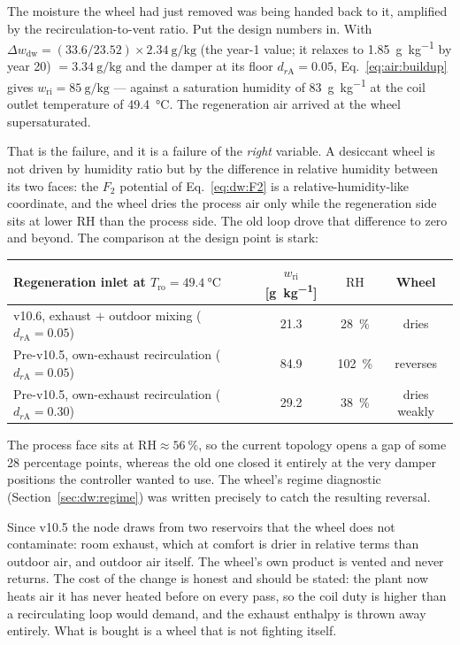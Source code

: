 \documentclass[11pt]{article}
\providecommand{\celsius}{\degreeCelsius}
\newcommand{\RH}{\ensuremath{\mathrm{RH}}}
\begin{document}
The moisture the wheel had just removed was being handed back to it, amplified
by the recirculation-to-vent ratio. Put the design numbers in. With
$\Delta w_{\mathrm{dw}} = (33.6/23.52)\times\SI{2.34}{\gram\per\kilogram}$ (the
year-1 value; it relaxes to \SI{1.85}{\gram\per\kilogram} by year 20)
$
= \SI{3.34}{\gram\per\kilogram}$ and the damper at its floor
$d_{r\mathrm{A}}=0.05$, Eq.~\eqref{eq:air:buildup} gives
$w_{\mathrm{ri}}=\SI{85}{\gram\per\kilogram}$ --- against a saturation humidity
of \SI{83}{\gram\per\kilogram} at the coil outlet temperature of
\SI{49.4}{\celsius}. The regeneration air arrived at the wheel supersaturated.

That is the failure, and it is a failure of the \emph{right} variable. A
desiccant wheel is not driven by humidity ratio but by the difference in
relative humidity between its two faces: the $F_2$ potential of
Eq.~\eqref{eq:dw:F2} is a relative-humidity-like coordinate, and the wheel
dries the process air only while the regeneration side sits at lower $\RH$
than the process side. The old loop drove that difference to zero and beyond.
The comparison at the design point is stark:

\begin{center}
\begin{tabular}{@{}lccc@{}}
\toprule
Regeneration inlet at $T_{\mathrm{ro}}=\SI{49.4}{\celsius}$
 & $w_{\mathrm{ri}}$ [\si{\gram\per\kilogram}] & $\RH$ & Wheel \\
\midrule
v10.6, exhaust $+$ outdoor mixing ($d_{r\mathrm{A}}=0.05$) & 21.3 & \SI{28}{\percent} & dries \\
Pre-v10.5, own-exhaust recirculation ($d_{r\mathrm{A}}=0.05$) & 84.9 & \SI{102}{\percent} & reverses \\
Pre-v10.5, own-exhaust recirculation ($d_{r\mathrm{A}}=0.30$) & 29.2 & \SI{38}{\percent} & dries weakly \\
\bottomrule
\end{tabular}
\end{center}

\noindent
The process face sits at $\RH\approx\SI{56}{\percent}$, so the current
topology opens a gap of some \num{28} percentage points, whereas the old one
closed it entirely at the very damper positions the controller wanted to use.
The wheel's regime diagnostic (Section~\ref{sec:dw:regime}) was written
precisely to catch the resulting reversal.

Since v10.5 the node draws from two reservoirs that the wheel does not
contaminate: room exhaust, which at comfort is drier in relative terms than
outdoor air, and outdoor air itself. The wheel's own product is vented and
never returns. The cost of the change is honest and should be stated: the plant
now heats air it has never heated before on every pass, so the coil duty is
higher than a recirculating loop would demand, and the exhaust enthalpy is
thrown away entirely. What is bought is a wheel that is not fighting itself.
\end{document}
